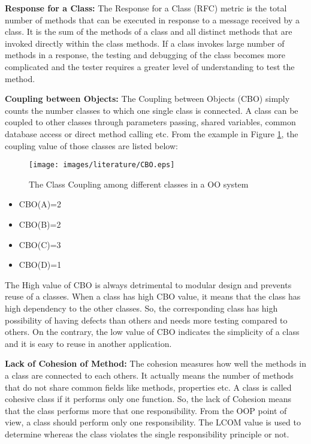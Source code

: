 \documentclass[12pt]{report}
\begin{document}
\textbf{Response for a Class:} 
The Response for a Class (RFC) metric is the total number of methods that can be executed in response to a message received by a class. It is the sum of the methods of a class and all distinct methods that are invoked directly within the class methods. If a class invokes large number of methods in a response, the testing and debugging of the class becomes more complicated and  the tester requires a greater level of understanding to test the method. 



\textbf{Coupling between Objects:}
The Coupling between Objects (CBO) simply counts the number classes to which one single class is connected. A class can be coupled to other classes through parameters passing, shared variables, common database access or direct method calling etc. From the example in Figure \ref{CBO_codeMetrics}, the coupling value of those classes are listed below: 
\begin{figure}[h!]
  \centering
    \texttt{[image: images/literature/CBO.eps]}
		\caption{The Class Coupling among different classes in a OO system}
		\label{CBO_codeMetrics}
\end{figure}

\begin{itemize}
	\item CBO(A)=2
	\item CBO(B)=2
	\item CBO(C)=3
	\item CBO(D)=1
\end{itemize}

The High value of CBO is always detrimental to modular design and prevents reuse of a classes. When a class has high CBO value, it means that the class has high dependency to the other classes. So, the corresponding class has high possibility of having defects than others and needs more testing compared to others. On the contrary, the low value of CBO indicates the simplicity of a class and it is easy to reuse in another application. 


\textbf{Lack of Cohesion of Method:} 
The cohesion measures how well the methods in a class are connected to each others. It actually means the number of methods that do not share common fields like methods, properties etc. A class is called cohesive class if it performs only one function. So, the lack of Cohesion means that the class performs more that one responsibility. From the OOP point of view, a class should perform only one responsibility. The LCOM value is used to determine whereas the class violates the single responsibility principle or not. 
\end{document}
